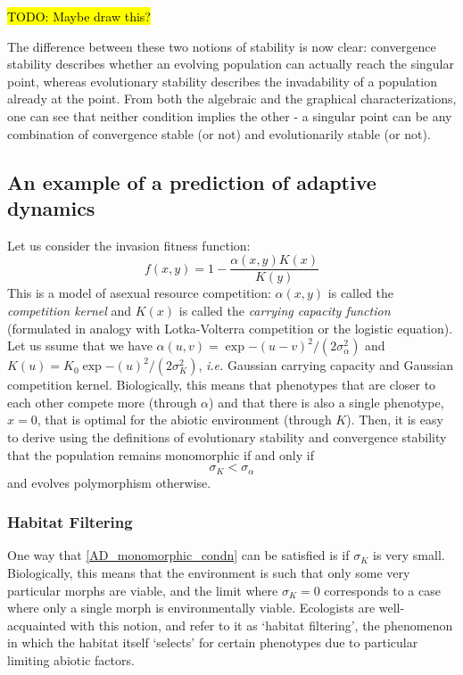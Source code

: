 {\textcolor{red}\hl{TODO: Maybe draw this?}}

The difference between these two notions of stability is now clear: convergence stability describes whether an evolving population can actually reach the singular point, whereas evolutionary stability describes the invadability of a population already at the point. From both the algebraic and the graphical characterizations, one can see that neither condition implies the other - a singular point can be any combination of convergence stable (or not) and evolutionarily stable (or not).  

\subsection{An example of a prediction of adaptive dynamics}

Let us consider the invasion fitness function:
\begin{equation}
	\label{AD_cts_logistic_invasion_fitness}
	f(x,y) = 1 - \frac{\alpha(x,y)K(x)}{K(y)}
\end{equation}
This is a model of asexual resource competition:  $\alpha(x,y)$ is called the \emph{competition kernel} and $K(x)$ is called the \emph{carrying capacity function} (formulated in analogy with Lotka-Volterra competition or the logistic equation).  Let us ssume that we have $\alpha(u,v) = \exp{-(u-v)^2/(2\sigma^{2}_{\alpha})}$ and $K(u) = K_{0}\exp{-(u)^2/(2\sigma^{2}_{K})}$, \emph{i.e.} Gaussian carrying capacity and Gaussian competition kernel. Biologically, this means that phenotypes that are closer to each other compete more (through $\alpha$) and that there is also a single phenotype, $x=0$, that is optimal for the abiotic environment (through $K$). Then, it is easy to derive using the definitions of evolutionary stability and convergence stability that the population remains monomorphic if and only if
\begin{equation}\label{AD_monomorphic_condn}
	\sigma_K<\sigma_{\alpha}
\end{equation}
and evolves polymorphism otherwise.
\subsubsection{Habitat Filtering}
One way that \ref{AD_monomorphic_condn} can be satisfied is if $\sigma_K$ is very small. Biologically, this means that the environment is such that only some very particular morphs are viable, and the limit where $\sigma_K = 0$ corresponds to a case where only a single morph is environmentally viable. Ecologists are well-acquainted with this notion, and refer to it as `habitat filtering', the phenomenon in which the habitat itself `selects' for certain phenotypes due to particular limiting abiotic factors.

